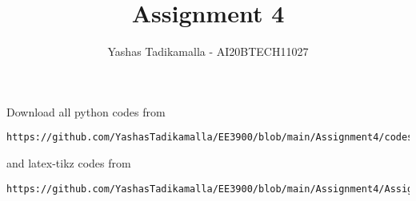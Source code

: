 \documentclass[journal,12pt,twocolumn]{IEEEtran}
\DeclareMathOperator*{\Res}{Res}
\begin{document}
\newcommand{\BEQA}{\begin{eqnarray}}
\newcommand{\EEQA}{\end{eqnarray}}
\newcommand{\define}{\stackrel{\triangle}{=}}

\raggedbottom
\setlength{\parindent}{0pt}
\providecommand{\mbf}{\mathbf}
\providecommand{\pr}[1]{\ensuremath{\Pr\left(#1\right)}}
\providecommand{\qfunc}[1]{\ensuremath{Q\left(#1\right)}}
\providecommand{\sbrak}[1]{\ensuremath{{}\left[#1\right]}}
\providecommand{\lsbrak}[1]{\ensuremath{{}\left[#1\right.}}
\providecommand{\rsbrak}[1]{\ensuremath{{}\left.#1\right]}}
\providecommand{\brak}[1]{\ensuremath{\left(#1\right)}}
\providecommand{\lbrak}[1]{\ensuremath{\left(#1\right.}}
\providecommand{\rbrak}[1]{\ensuremath{\left.#1\right)}}
\providecommand{\cbrak}[1]{\ensuremath{\left\{#1\right\}}}
\providecommand{\lcbrak}[1]{\ensuremath{\left\{#1\right.}}
\providecommand{\rcbrak}[1]{\ensuremath{\left.#1\right\}}}
\theoremstyle{remark}
\newtheorem{rem}{Remark}
\newcommand{\sgn}{\mathop{\mathrm{sgn}}}
\providecommand{\abs}[1]{\vert#1\vert}
\providecommand{\res}[1]{\Res\displaylimits_{#1}} 
\providecommand{\norm}[1]{\lVert#1\rVert}
\providecommand{\mtx}[1]{\mathbf{#1}}
\providecommand{\mean}[1]{E[ #1 ]}
\providecommand{\fourier}{\overset{\mathcal{F}}{ \rightleftharpoons}}
\providecommand{\system}{\overset{\mathcal{H}}{ \longleftrightarrow}}
\newcommand{\solution}{\noindent \textbf{Solution: }}
\newcommand{\cosec}{\,\text{cosec}\,}
\providecommand{\dec}[2]{\ensuremath{\overset{#1}{\underset{#2}{\gtrless}}}}
\newcommand{\myvec}[1]{\ensuremath{\begin{pmatrix}#1\end{pmatrix}}}
\newcommand{\mydet}[1]{\ensuremath{\begin{vmatrix}#1\end{vmatrix}}}
\makeatletter
{}
\makeatother
\let\StandardTheFigure\thefigure
\let\vec\mathbf
\renewcommand{\thefigure}{\theproblem}
\def\putbox#1#2#3{\makebox[0in][l]{\makebox[#1][l]{}\raisebox{\baselineskip}[0in][0in]{\raisebox{#2}[0in][0in]{#3}}}}
     \def\rightbox#1{\makebox[0in][r]{#1}}
     \def\centbox#1{\makebox[0in]{#1}}
     \def\topbox#1{\raisebox{-\baselineskip}[0in][0in]{#1}}
     \def\midbox#1{\raisebox{-0.5\baselineskip}[0in][0in]{#1}}
\vspace{3cm}
\title{Assignment 4}
\author{Yashas Tadikamalla - AI20BTECH11027}
\maketitle
\newpage
\bigskip
\renewcommand{\thefigure}{\theenumi}
\renewcommand{\thetable}{\theenumi}
Download all python codes from 
\begin{lstlisting}
https://github.com/YashasTadikamalla/EE3900/blob/main/Assignment4/codes
\end{lstlisting}
%
and latex-tikz codes from 
%
\begin{lstlisting}
https://github.com/YashasTadikamalla/EE3900/blob/main/Assignment4/Assignment4.tex
\end{lstlisting}
\end{document}
